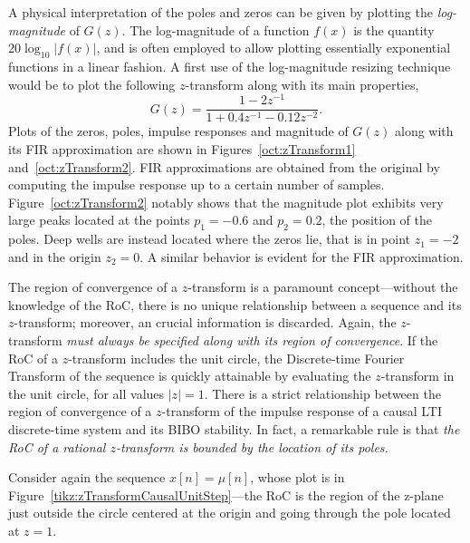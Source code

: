 \documentclass[\documentfontsize, twocolumn]{\classname}
\begin{document}
A physical interpretation of the poles and zeros can be given by plotting the \emph{log-magnitude} of $G(z)$. The log-magnitude of a function $f(x)$ is the quantity $20\log_{10}{\left|f(x)\right|}$, and is often employed to allow plotting essentially exponential functions in a linear fashion. A first use of the log-magnitude resizing technique would be to plot the following $z$-transform along with its main properties,
\[
    G(z) = \frac {
        1 - 2z^{-1}
    } {
        1 + 0.4z^{-1} - 0.12z^{-2}
    }.
\]
Plots of the zeros, poles, impulse responses and magnitude of $G(z)$ along with its FIR approximation are shown in Figures~\ref{oct:zTransform1} and~\ref{oct:zTransform2}. FIR approximations are obtained from the original by computing the impulse response up to a certain number of samples. Figure~\ref{oct:zTransform2} notably shows that the magnitude plot exhibits very large peaks located at the points $p_1 = -0.6$ and $p_2 = 0.2$, the position of the poles. Deep wells are instead located where the zeros lie, that is in point $z_1 = -2$ and in the origin $z_2 = 0$. A similar behavior is evident for the FIR approximation.

The region of convergence of a $z$-transform is a paramount concept---without the knowledge of the RoC, there is no unique relationship between a sequence and its $z$-transform; moreover, an crucial information is discarded. Again, the $z$-transform \emph{must always be specified along with its region of convergence}.
If the RoC of a $z$-transform includes the unit circle, the Discrete-time Fourier Transform of the sequence is quickly attainable by evaluating the $z$-transform in the unit circle, for all values $|z| = 1$. There is a strict relationship between the region of convergence of a $z$-transform of the impulse response of a causal LTI discrete-time system and its BIBO stability. In fact, a remarkable rule is that \emph{the RoC of a rational $z$-transform is bounded by the location of its poles.}

Consider again the sequence $x[n] = \mu[n]$, whose plot is in Figure~\ref{tikz:zTransformCausalUnitStep}---the RoC is the region of the z-plane just outside the circle centered at the origin and going through the pole located at $z=1$.
\end{document}
